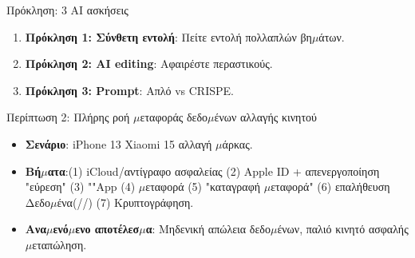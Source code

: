 \begin{tcbpractice}{Πρόκληση: 3 AI ασκήσεις}
\begin{enumerate}
  \item \textbf{Πρόκληση 1: Σύνθετη εντολή}: Πείτε εντολή πολλαπλών βη$\mu$άτων.
  \item \textbf{Πρόκληση 2: AI editing}: Αφαιρέστε περαστικούς.
  \item \textbf{Πρόκληση 3: Prompt}: Απλό vs CRISPE.
\end{enumerate}

\end{tcbpractice}

\begin{tcbinfo}{Περίπτωση 2: Πλήρης ροή $\mu$εταφοράς δεδο$\mu$ένων αλλαγής κινητού}
\begin{itemize}
  \item \textbf{Σενάριο}: iPhone 13 Xiaomi 15 αλλαγή $\mu$άρκας.
  \item \textbf{Βή$\mu$ατα}:(1) iCloud/αντίγραφο ασφαλείας (2) Apple ID + απενεργοποίηση "εύρεση" (3) ""App (4) $\mu$εταφορά (5) "καταγραφή $\mu$εταφορά" (6) επαλήθευση Δεδο$\mu$ένα(//) (7) Κρυπτογράφηση.
  \item \textbf{Ανα$\mu$ενό$\mu$ενο αποτέλεσ$\mu$α}: Μηδενική απώλεια δεδο$\mu$ένων, παλιό κινητό ασφαλής $\mu$εταπώληση.
\end{itemize}

\end{tcbinfo}
